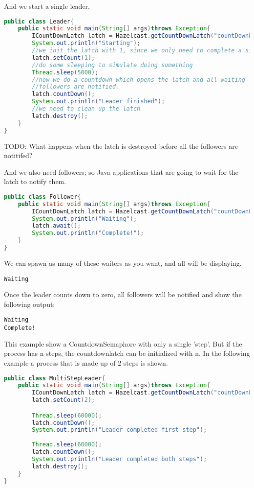 And we start a single leader, 
\begin{lstlisting}[language=java]
public class Leader{
    public static void main(String[] args)throws Exception{
        ICountDownLatch latch = Hazelcast.getCountDownLatch("countDownLatch");
        System.out.println("Starting");
        //we init the latch with 1, since we only need to complete a single step.
        latch.setCount(1); 
        //do some sleeping to simulate doing something    
        Thread.sleep(5000);
        //now we do a countdown which opens the latch and all waiting
        //followers are notified.
        latch.countDown();
        System.out.println("Leader finished");
        //we need to clean up the latch
        latch.destroy();
    }
}
\end{lstlisting}

TODO: What happens when the latch is destroyed before all the followers are notitifed?

And we also need followers; so Java applications that are going to wait for the 
latch to notify them.

\begin{lstlisting}[language=java]
public class Follower{
    public static void main(String[] args)throws Exception{
        ICountDownLatch latch = Hazelcast.getCountDownLatch("countDownLatch");
        System.out.println("Waiting");
        latch.await();
        System.out.println("Complete!");
    }
}
\end{lstlisting}
We can spawn as many of these waiters as you want, and all will be displaying.

\begin{verbatim}
Waiting
\end{verbatim}

Once the leader counts down to zero, all followers will be notified and show the following output:

\begin{verbatim}
Waiting
Complete!
\end{verbatim}

This example show a CountdownSemaphore with only a single 'step'. But if the process has n steps,
the countdownlatch can be initialized with n. In the following example a process that is made up of 2 steps is shown.

\begin{lstlisting}[language=java]
public class MultiStepLeader{
    public static void main(String[] args)throws Exception{
        ICountDownLatch latch = Hazelcast.getCountDownLatch("countDownLatch");
        latch.setCount(2);

        Thread.sleep(60000); 
        latch.countDown();
        System.out.println("Leader completed first step");
        
        Thread.sleep(60000); 
        latch.countDown();
        System.out.println("Leader completed both steps");
        latch.destroy();
    }
}
\end{lstlisting}


